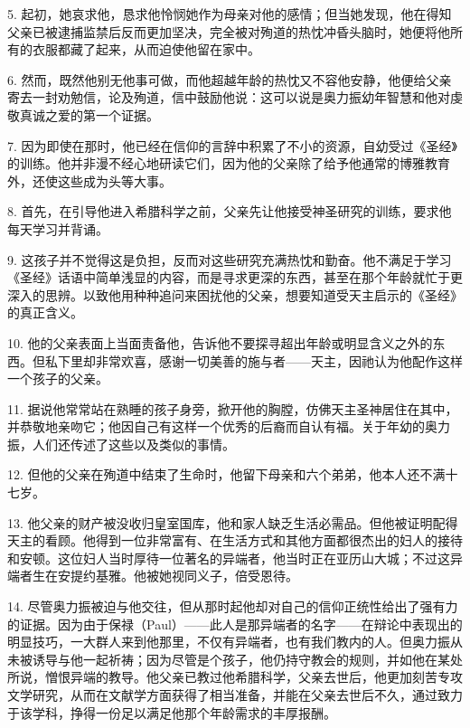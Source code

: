 5. 起初，她哀求他，恳求他怜悯她作为母亲对他的感情；但当她发现，他在得知父亲已被逮捕监禁后反而更加坚决，完全被对殉道的热忱冲昏头脑时，她便将他所有的衣服都藏了起来，从而迫使他留在家中。\par

6. 然而，既然他别无他事可做，而他超越年龄的热忱又不容他安静，他便给父亲寄去一封劝勉信，论及殉道，信中鼓励他说：这可以说是奥力振幼年智慧和他对虔敬真诚之爱的第一个证据。\par

7. 因为即使在那时，他已经在信仰的言辞中积累了不小的资源，自幼受过《圣经》的训练。他并非漫不经心地研读它们，因为他的父亲除了给予他通常的博雅教育外，还使这些成为头等大事。\par

8. 首先，在引导他进入希腊科学之前，父亲先让他接受神圣研究的训练，要求他每天学习并背诵。\par

9. 这孩子并不觉得这是负担，反而对这些研究充满热忱和勤奋。他不满足于学习《圣经》话语中简单浅显的内容，而是寻求更深的东西，甚至在那个年龄就忙于更深入的思辨。以致他用种种追问来困扰他的父亲，想要知道受天主启示的《圣经》的真正含义。\par

10. 他的父亲表面上当面责备他，告诉他不要探寻超出年龄或明显含义之外的东西。但私下里却非常欢喜，感谢一切美善的施与者——天主，因祂认为他配作这样一个孩子的父亲。\par

11. 据说他常常站在熟睡的孩子身旁，掀开他的胸膛，仿佛天主圣神居住在其中，并恭敬地亲吻它；他因自己有这样一个优秀的后裔而自认有福。关于年幼的奥力振，人们还传述了这些以及类似的事情。\par

12. 但他的父亲在殉道中结束了生命时，他留下母亲和六个弟弟，他本人还不满十七岁。\par

13. 他父亲的财产被没收归皇室国库，他和家人缺乏生活必需品。但他被证明配得天主的看顾。他得到一位非常富有、在生活方式和其他方面都很杰出的妇人的接待和安顿。这位妇人当时厚待一位著名的异端者，他当时正在亚历山大城；不过这异端者生在安提约基雅。他被她视同义子，倍受恩待。\par

14. 尽管奥力振被迫与他交往，但从那时起他却对自己的信仰正统性给出了强有力的证据。因为由于保禄（Paul）——此人是那异端者的名字——在辩论中表现出的明显技巧，一大群人来到他那里，不仅有异端者，也有我们教内的人。但奥力振从未被诱导与他一起祈祷；因为尽管是个孩子，他仍持守教会的规则，并如他在某处所说，憎恨异端的教导。他父亲已教过他希腊科学，父亲去世后，他更加刻苦专攻文学研究，从而在文献学方面获得了相当准备，并能在父亲去世后不久，通过致力于该学科，挣得一份足以满足他那个年龄需求的丰厚报酬。\par

